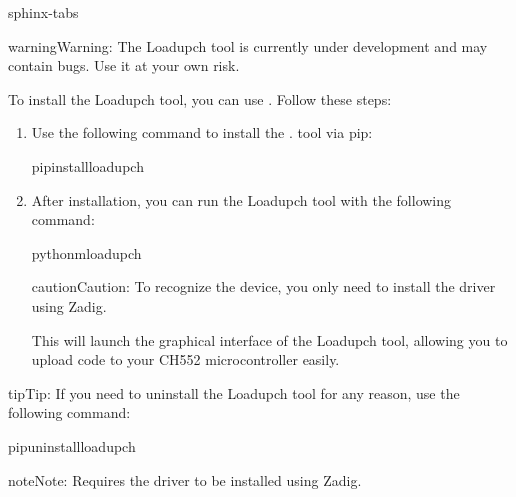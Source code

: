 \documentclass[letterpaper,10pt,english]{sphinxmanual}
\begin{document}
\begin{sphinxuseclass}{sphinx-tabs}
\begin{sphinxadmonition}{warning}{Warning:}
\sphinxAtStartPar
The Loadupch tool is currently under development and may contain bugs. Use it at your own risk.
\end{sphinxadmonition}

\sphinxAtStartPar
To install the Loadupch tool, you can use . Follow these steps:
\begin{enumerate}
%
\item {} 
\sphinxAtStartPar
{}

\sphinxAtStartPar
Use the following command to install the . tool via pip:

\begin{sphinxVerbatim}[commandchars=\\\{\}]
pipinstallloadupch
\end{sphinxVerbatim}

\item {} 
\sphinxAtStartPar
{}

\sphinxAtStartPar
After installation, you can run the Loadupch tool with the following command:

\begin{sphinxVerbatim}[commandchars=\\\{\}]
python\PYGZhy{}mloadupch
\end{sphinxVerbatim}

\begin{sphinxadmonition}{caution}{Caution:}
\sphinxAtStartPar
To recognize the device, you only need to install the  driver using Zadig.
\end{sphinxadmonition}

\sphinxAtStartPar
This will launch the graphical interface of the Loadupch tool, allowing you to upload code to your CH552 microcontroller easily.

\end{enumerate}

\begin{sphinxadmonition}{tip}{Tip:}
\sphinxAtStartPar
If you need to uninstall the Loadupch tool for any reason, use the following command:

\begin{sphinxVerbatim}[commandchars=\\\{\}]
pipuninstallloadupch
\end{sphinxVerbatim}
\end{sphinxadmonition}

\begin{sphinxadmonition}{note}{Note:}
\sphinxAtStartPar
Requires the  driver to be installed using Zadig.
\end{sphinxadmonition}

\end{sphinxuseclass}
\sphinxstepscope
\end{document}
